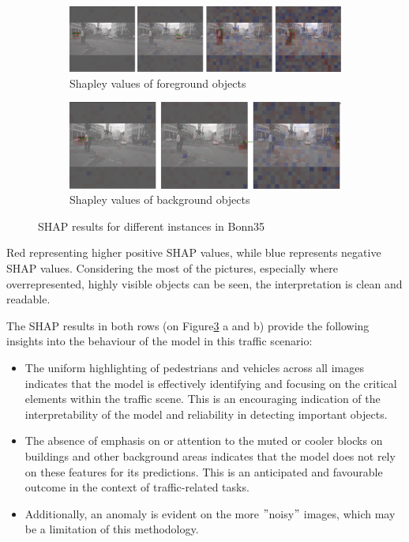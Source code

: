 \begin{figure}[h]
    \centering
    \begin{subfigure}[b]{\textwidth}
        \includegraphics[width=\textwidth]{figures/output1}
        \caption{Shapley values of foreground objects}\label{fig:SHAP_results11}
    \end{subfigure}
    \hfill
    \begin{subfigure}[b]{\textwidth}
        \includegraphics[width=\textwidth]{figures/output1,2}
        \caption{Shapley values of background objects}\label{fig:SHAP_results12}
    \end{subfigure}
    \hfill
    \caption{SHAP results for different instances in Bonn35}
    \label{fig:SHAP_result}
\end{figure}


Red representing higher positive SHAP values, while blue represents negative SHAP values.
Considering the most of the pictures, especially where overrepresented, highly visible objects can be seen, the interpretation is clean and readable.


The SHAP results in both rows (on Figure\ref{fig:SHAP_result} a and b) provide the following insights into the behaviour of the model in this traffic scenario:

\begin{itemize}
\item The uniform highlighting of pedestrians and vehicles across all images indicates that the model is effectively identifying and focusing on the critical elements within the traffic scene. This is an encouraging indication of the interpretability of the model and reliability in detecting important objects.
\item The absence of emphasis on or attention to the muted or cooler blocks on buildings and other background areas indicates that the model does not rely on these features for its predictions. This is an anticipated and favourable outcome in the context of traffic-related tasks.
\item Additionally, an anomaly is evident on the more \("\)noisy\("\) images, which may be a limitation of this methodology.
\end{itemize}




